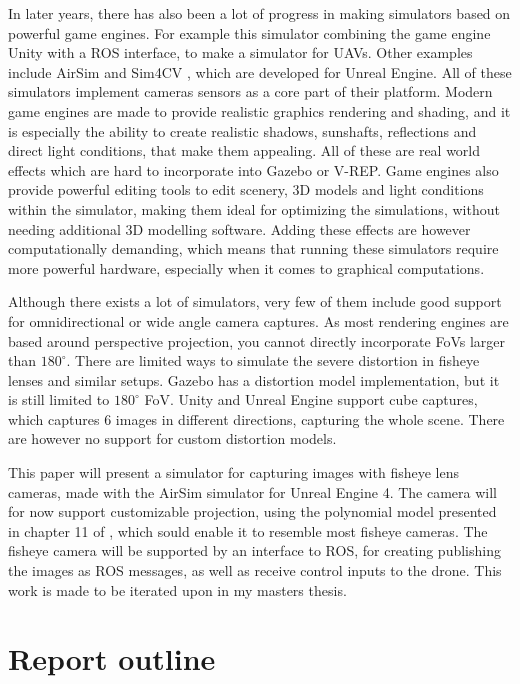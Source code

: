 In later years, there has also been a lot of progress in making simulators based on powerful game engines. For example this simulator \cite{UnityROSsim} combining the game engine Unity with a ROS interface, to make a simulator for UAVs. Other examples include AirSim \cite{Airsim_paper} and Sim4CV \cite{Sim4CV_paper}, which are developed for Unreal Engine. All of these simulators implement cameras sensors as a core part of their platform. Modern game engines are made to provide realistic graphics rendering and shading, and it is especially the ability to create realistic shadows, sunshafts, reflections and direct light conditions, that make them appealing. All of these are real world effects which are hard to incorporate into Gazebo or V-REP. Game engines also provide powerful editing tools to edit scenery, 3D models and light conditions within the simulator, making them ideal for optimizing the simulations, without needing additional 3D modelling software. Adding these effects are however computationally demanding, which means that running these simulators require more powerful hardware, especially when it comes to graphical computations. 

Although there exists a lot of simulators, very few of them include good support for omnidirectional or wide angle camera captures. As most rendering engines are based around perspective projection, you cannot directly incorporate FoVs larger than $180^\circ$. There are limited ways to simulate the severe distortion in fisheye lenses and similar setups. Gazebo has a distortion model implementation, but it is still limited to $180^\circ$ FoV. Unity and Unreal Engine support cube captures, which captures 6 images in different directions, capturing the whole scene. There are however no support for custom distortion models. 

This paper will present a simulator for capturing images with fisheye lens cameras, made with the AirSim simulator for Unreal Engine 4. The camera will for now support customizable projection, using the polynomial model presented in chapter 11 of \cite{FisheyeCorke} , which sould enable it to resemble most fisheye cameras. The fisheye camera will be supported by an interface to ROS, for creating publishing the images as ROS messages, as well as receive control inputs to the drone. This work is made to be iterated upon in my masters thesis.

\section{Report outline}

